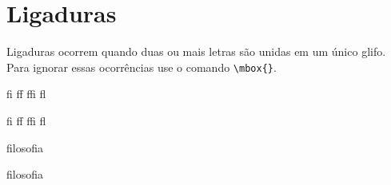 \documentclass[a4paper]{article}
\begin{document}
\section*{Ligaduras}

Ligaduras ocorrem quando duas ou mais letras são unidas em um único glifo. Para ignorar essas ocorrências use o comando \verb|\mbox{}|.

\Huge fi ff ffi fl

f\mbox{}i f\mbox{}f f\mbox{}f\mbox{}i f\mbox{}l

filosofia

f\mbox{}ilosof\mbox{}ia
\end{document}
